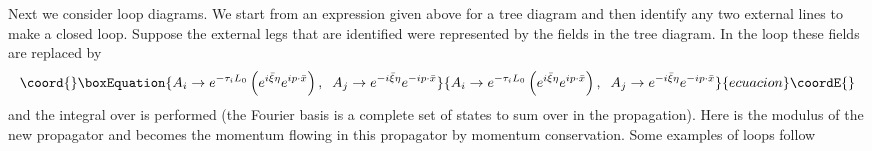 \documentclass[a4paper,11pt]{article}
\begin{document}
Next we consider loop diagrams. We start from an expression given above for
a tree diagram and then identify any two external lines to make a closed
loop. Suppose the external legs that are identified were represented by the
fields \coordHE{} in the tree diagram. In the loop these fields are
replaced by
\begin{equation}\coord{}\boxEquation{
A_{i}\rightarrow e^{-\tau _{i}L_{0}}\left( e^{i\bar{\xi}\eta }e^{ip\cdot
\bar{x}}\right) ,\;\;A_{j}\rightarrow e^{-i\bar{\xi}\eta }e^{-ip\cdot \bar{x}
}
}{
A_{i}\rightarrow e^{-\tau _{i}L_{0}}\left( e^{i\bar{\xi}\eta }e^{ip\cdot
\bar{x}}\right) ,\;\;A_{j}\rightarrow e^{-i\bar{\xi}\eta }e^{-ip\cdot \bar{x}
}
}{ecuacion}\coordE{}\end{equation}%
and the integral over \myHighlight{$\eta $}\coordHE{} is performed (the Fourier basis is a complete
set of states to sum over in the propagation). Here \coordHE{} is the
modulus of the new propagator and \coordHE{} becomes the momentum flowing in
this propagator by momentum conservation. Some examples of loops follow
\end{document}

